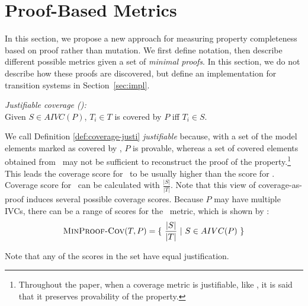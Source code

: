 \newcommand{\minproofcov}{\text{\sc MinProof-Cov}}


\section{Proof-Based Metrics}
\label{sec:method}

In this section, we propose a new approach for measuring property completeness based on proof rather than mutation.  We first define notation, then describe different possible metrics given a set of {\em minimal proofs}.  In this section, we do not describe how these proofs are discovered, but define an implementation for transition systems in Section~\ref{sec:impl}.

\begin{definition} {\emph{Justifiable coverage (\ivccov):}} \\
  \label{def:coverage-justi}
Given $S \in AIVC(P)$, $T_i \in T$ is covered by $P$ iff  $T_i \in S$.
\end{definition}
\vspace{2mm}

%
We call Definition \ref{def:coverage-justi} \emph{justifiable} because, with a set of the model elements marked as covered by \ivccov, $P$ is provable, whereas a set of covered elements obtained from \nondetcov\ may not be sufficient to reconstruct the proof of the property.\footnote{Throughout the paper, when a coverage metric is justifiable, like \ivccov, it is said that it preserves provability of the property.}
This leads the coverage score for \ivccov\ to be usually higher than the score for \nondetcov. Coverage score for \ivccov\ can be calculated with $\frac{|S|}{|T|}$. Note that this view of coverage-as-proof induces several possible coverage scores. Because $P$ may have multiple IVCs, there can be a range of scores for the \ivccov\ metric, which is shown by \minproofcov:
\[
   \minproofcov(T, P) = \{~\frac{ |S|}{|T|}~|~S \in AIVC(P)~\}
\]

\noindent Note that any of the scores in the set have equal justification.

